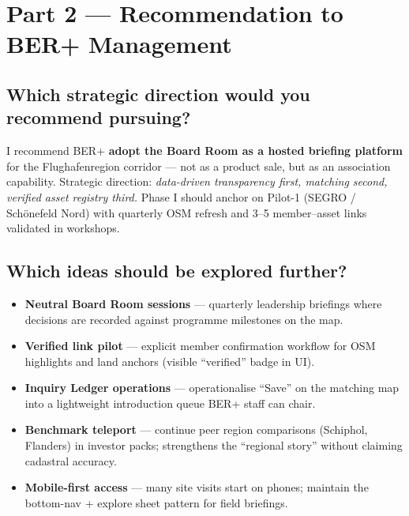 \documentclass[11pt,a4paper]{article}
\begin{document}
\section*{Part 2 — Recommendation to BER+ Management}

\subsection*{Which strategic direction would you recommend pursuing?}
I recommend BER+ \textbf{adopt the Board Room as a hosted briefing platform} for the Flughafenregion corridor — not as a product sale, but as an association capability. Strategic direction: \textit{data-driven transparency first, matching second, verified asset registry third.} Phase I should anchor on Pilot-1 (SEGRO / Schönefeld Nord) with quarterly OSM refresh and 3--5 member--asset links validated in workshops.

\subsection*{Which ideas should be explored further?}
\begin{itemize}
  \item \textbf{Neutral Board Room sessions} — quarterly leadership briefings where decisions are recorded against programme milestones on the map.
  \item \textbf{Verified link pilot} — explicit member confirmation workflow for OSM highlights and land anchors (visible ``verified'' badge in UI).
  \item \textbf{Inquiry Ledger operations} — operationalise ``Save'' on the matching map into a lightweight introduction queue BER+ staff can chair.
  \item \textbf{Benchmark teleport} — continue peer region comparisons (Schiphol, Flanders) in investor packs; strengthens the ``regional story'' without claiming cadastral accuracy.
  \item \textbf{Mobile-first access} — many site visits start on phones; maintain the bottom-nav + explore sheet pattern for field briefings.
\end{itemize}
\end{document}
